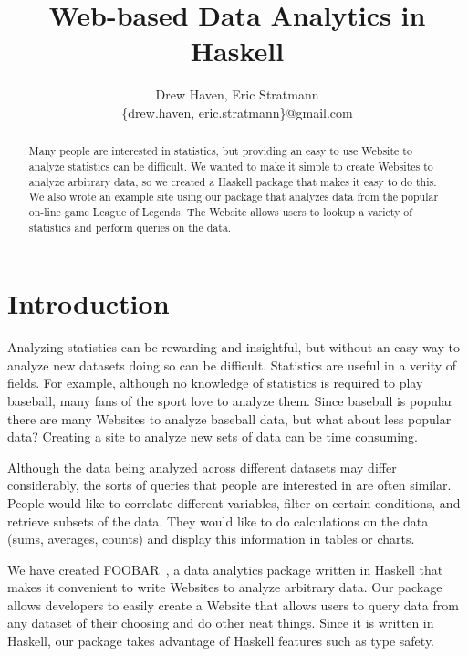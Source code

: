 \documentclass[letterpaper,twocolumn,9pt]{article}
\begin{document}
\title{\Large \bf Web-based Data Analytics in Haskell}

\date{}

\author{
{\rm Drew Haven, Eric Stratmann}\\
\{drew.haven, eric.stratmann\}@gmail.com
} %

\maketitle


\begin{abstract}
Many people are interested in statistics, but providing an easy to use Website to analyze statistics can be difficult. We wanted to make it simple to create Websites to analyze arbitrary data, so we created a Haskell package that makes it easy to do this. We also wrote an example site using our package that analyzes data from the popular on-line game League of Legends. The Website allows users to lookup a variety of statistics and perform queries on the data.
\end{abstract}

\section{Introduction}

Analyzing statistics can be rewarding and insightful, but without an easy way to analyze new datasets doing so can be difficult. Statistics are useful in a verity of fields. For example, although no knowledge of statistics is required to play baseball, many fans of the sport love to analyze them. Since baseball is popular there are many Websites to analyze baseball data, but what about less popular data? Creating a site to analyze new sets of data can be time consuming.

Although the data being analyzed across different datasets may differ considerably, the sorts of queries that people are interested in are often similar. People would like to correlate different variables, filter on certain conditions, and retrieve subsets of the data. They would like to do calculations on the data (sums, averages, counts) and display this information in tables or charts.

We have created FOOBAR~\cite{foobar}, a data analytics package written in Haskell that makes it convenient to write Websites to analyze arbitrary data. Our package allows developers to easily create a Website that allows users to query data from any dataset of their choosing and do other neat things. Since it is written in Haskell, our package takes advantage of Haskell features such as type safety.
\end{document}
